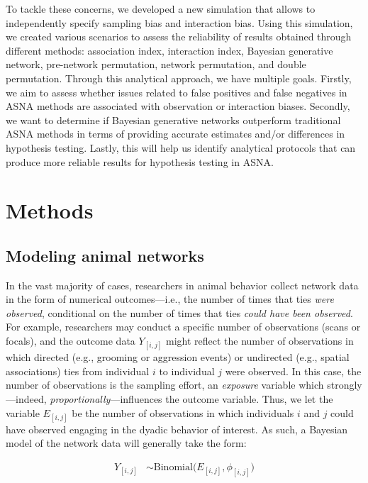 \documentclass[Afour,sageh,times]{sagej}
\begin{document}
To tackle these concerns, we developed a new simulation that allows to independently specify sampling bias and interaction bias. Using this simulation, we created various scenarios to assess the reliability of results obtained through different methods: association index, interaction index, Bayesian generative network, pre-network permutation, network permutation, and double permutation. Through this analytical approach, we have multiple goals. Firstly, we aim to assess whether issues related to false positives and false negatives in ASNA methods are associated with observation or interaction biases. Secondly, we want to determine if Bayesian generative networks outperform traditional ASNA methods in terms of providing accurate estimates and/or differences in hypothesis testing. Lastly, this will help us identify analytical protocols that can produce more reliable results for hypothesis testing in ASNA.

\section{Methods}

\subsection{Modeling animal networks}
In the vast majority of cases, researchers in animal behavior  collect network data in the form of numerical outcomes---i.e., the number of times that ties \emph{were observed}, conditional on the number of times that ties \emph{could have been observed}. For example, researchers may conduct a specific number of observations (scans or focals), and the outcome data $Y_{[i,j]}$ might reflect the number of observations in which directed (e.g., grooming or aggression events) or undirected (e.g., spatial associations) ties from individual $i$ to individual $j$ were observed. In this case, the number of observations is the sampling effort,  an \emph{exposure} variable which strongly---indeed, \emph{proportionally}---influences the outcome variable. Thus, we let the variable $E_{[i,j]}$ be the number of observations in which individuals $i$ and $j$ could have observed engaging in the dyadic behavior of interest. As such, a Bayesian model of the network data will generally take the form:  

\begin{ceqn}
\begin{align}\label{maineq}
	Y_{[i,j]} &\sim \mathrm{Binomial}\Big(E_{[i,j]}, \phi_{[i,j]} \Big)
\end{align}
\end{ceqn}
\end{document}
